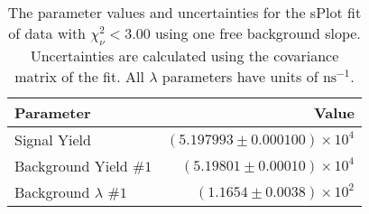
\begin{table}[ht]
    \begin{center}
        \begin{tabular}{lr}\toprule
            Parameter & Value \\\midrule
            Signal Yield & $(5.197993 \pm 0.000100) \times 10^{4}$ \\
            Background Yield $\#1$ & $(5.19801 \pm 0.00010) \times 10^{4}$ \\
            Background $\lambda$ $\#1$ & $(1.1654 \pm 0.0038) \times 10^{2}$ \\\bottomrule
        \end{tabular}
        \caption{The parameter values and uncertainties for the sPlot fit of data with $\chi^2_\nu < 3.00$ using one free background slope. Uncertainties are calculated using the covariance matrix of the fit. All $\lambda$ parameters have units of $\si{\nano\second}^{-1}$.}\label{tab:splot-fit-results-chisqdof-3.00-free-1}
    \end{center}
\end{table}
